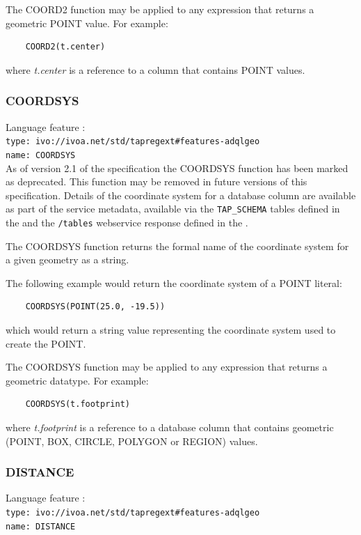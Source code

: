 \documentclass[11pt,a4paper]{ivoa}
\begin{document}
The COORD2 function may be applied to any expression that returns a
geometric POINT value.
For example:
\begin{verbatim}
    COORD2(t.center)
\end{verbatim}
\noindent
where \textit{t.center} is a reference to a column that contains POINT values.

\subsubsection{COORDSYS}
\label{sec:functions.geom.coordsys}
{\footnotesize Language feature :}\\
{\footnotesize \verb|type: ivo://ivoa.net/std/tapregext#features-adqlgeo|}\\
{\footnotesize \verb|name: COORDSYS|}\\

As of version 2.1 of the specification the COORDSYS function has
been marked as deprecated. This function may be removed in future versions
of this specification.
Details of the coordinate system for a database column are available as part of
the service metadata, available via the \verb:TAP_SCHEMA: tables defined in the
\TAPSpec{} and the \verb:/tables: webservice response defined in the \VOSISpec{}.


The COORDSYS function returns the formal name of the coordinate system for
a given geometry as a string.

The following example would return the coordinate system of a POINT literal:
\begin{verbatim}
    COORDSYS(POINT(25.0, -19.5))
\end{verbatim}
\noindent
which would return a string value representing the coordinate system used
to create the POINT.

The COORDSYS function may be applied to any expression that returns a
geometric datatype. For example:
\begin{verbatim}
    COORDSYS(t.footprint)
\end{verbatim}
\noindent
where \textit{t.footprint} is a reference to a database column that
contains geometric (POINT, BOX, CIRCLE, POLYGON or REGION) values.

\subsubsection{DISTANCE}
\label{sec:functions.geom.distance}
{\footnotesize Language feature :}\\
{\footnotesize \verb|type: ivo://ivoa.net/std/tapregext#features-adqlgeo|}\\
{\footnotesize \verb|name: DISTANCE|}\\
\end{document}
